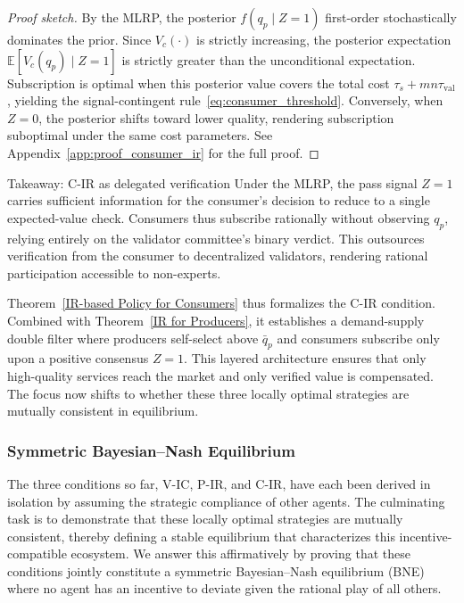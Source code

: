 \begin{proof}[Proof sketch]
By the MLRP, the posterior $f(q_p \mid Z = 1)$ first-order stochastically dominates the prior. Since $V_c(\cdot)$ is strictly increasing, the posterior expectation $\mathbb{E}[V_c(q_p) \mid Z = 1]$ is strictly greater than the unconditional expectation. Subscription is optimal when this posterior value covers the total cost $\tau_s + mn\tau_{\text{val}}$, yielding the signal-contingent rule~\eqref{eq:consumer_threshold}. Conversely, when $Z = 0$, the posterior shifts toward lower quality, rendering subscription suboptimal under the same cost parameters. See Appendix~\ref{app:proof_consumer_ir} for the full proof.
\end{proof}

\begin{interpretbox}{Takeaway: C-IR as delegated verification}
Under the MLRP, the pass signal $Z=1$ carries sufficient information for the consumer's decision to reduce to a single expected-value check. Consumers thus subscribe rationally without observing $q_p$, relying entirely on the validator committee's binary verdict. This outsources verification from the consumer to decentralized validators, rendering rational participation accessible to non-experts.
\end{interpretbox}

\noindent Theorem~\ref{IR-based Policy for Consumers} thus formalizes the C-IR condition. Combined with Theorem~\ref{IR for Producers}, it establishes a demand-supply double filter where producers self-select above $\bar{q}_p$ and consumers subscribe only upon a positive consensus $Z=1$. This layered architecture ensures that only high-quality services reach the market and only verified value is compensated. The focus now shifts to whether these three locally optimal strategies are mutually consistent in equilibrium.

\subsubsection{Symmetric Bayesian--Nash Equilibrium}
\label{sec:bne}

The three conditions so far, V-IC, P-IR, and C-IR, have each been derived in isolation by assuming the strategic compliance of other agents. The culminating task is to demonstrate that these locally optimal strategies are mutually consistent, thereby defining a stable equilibrium that characterizes this incentive-compatible ecosystem. We answer this affirmatively by proving that these conditions jointly constitute a symmetric Bayesian--Nash equilibrium (BNE) where no agent has an incentive to deviate given the rational play of all others.

